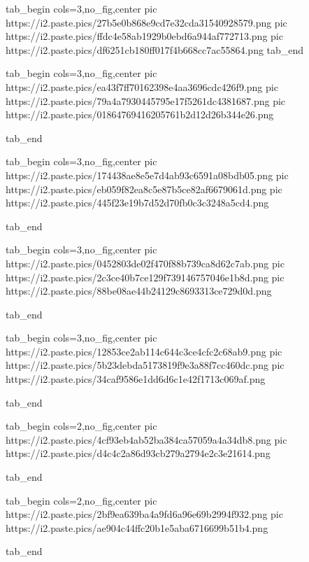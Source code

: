  
 
 
 
 
\zzSecCmtScr

\ifcmt
  tab_begin cols=3,no_fig,center
     pic https://i2.paste.pics/27b5e0b868e9cd7e32cda31540928579.png
		 pic https://i2.paste.pics/ffdc4e58ab1929b0ebd6a944af772713.png
		 pic https://i2.paste.pics/df6251cb180ff017f4b668cc7ac55864.png
  tab_end
\fi

\ifcmt
  tab_begin cols=3,no_fig,center
	pic https://i2.paste.pics/ea43f7ff70162398e4aa3696cdc426f9.png
	pic https://i2.paste.pics/79a4a7930445795e17f5261dc4381687.png
	pic https://i2.paste.pics/01864769416205761b2d12d26b344e26.png

  tab_end
\fi

\ifcmt
  tab_begin cols=3,no_fig,center
	pic https://i2.paste.pics/174438ae8e5e7d4ab93c6591a08bdb05.png
	pic https://i2.paste.pics/eb059f82ea8c5e87b5ce82af6679061d.png
	pic https://i2.paste.pics/445f23e19b7d52d70fb0c3c3248a5cd4.png

  tab_end
\fi

\ifcmt
  tab_begin cols=3,no_fig,center
	pic https://i2.paste.pics/0452803de02f470f88b739ca8d62c7ab.png
	pic https://i2.paste.pics/2c3ce40b7ce129f739146757046e1b8d.png
	pic https://i2.paste.pics/88be08ae44b24129c8693313ce729d0d.png

  tab_end
\fi

\ifcmt
  tab_begin cols=3,no_fig,center
	pic https://i2.paste.pics/12853ce2ab114c644c3ce4cfc2c68ab9.png
	pic https://i2.paste.pics/5b23debda5173819f9e3a88f7cc460dc.png
	pic https://i2.paste.pics/34caf9586e1dd6d6c1e42f1713c069af.png

  tab_end
\fi

\ifcmt
  tab_begin cols=2,no_fig,center
	pic https://i2.paste.pics/4cf93eb4ab52ba384ca57059a4a34db8.png
	pic https://i2.paste.pics/d4c4c2a86d93cb279a2794e2c3e21614.png

  tab_end
\fi

\ifcmt
  tab_begin cols=2,no_fig,center
		pic https://i2.paste.pics/2bf9ea639ba4a9fd6a96e69b2994f932.png
		pic https://i2.paste.pics/ae904c44ffc20b1e5aba6716699b51b4.png

  tab_end
\fi
